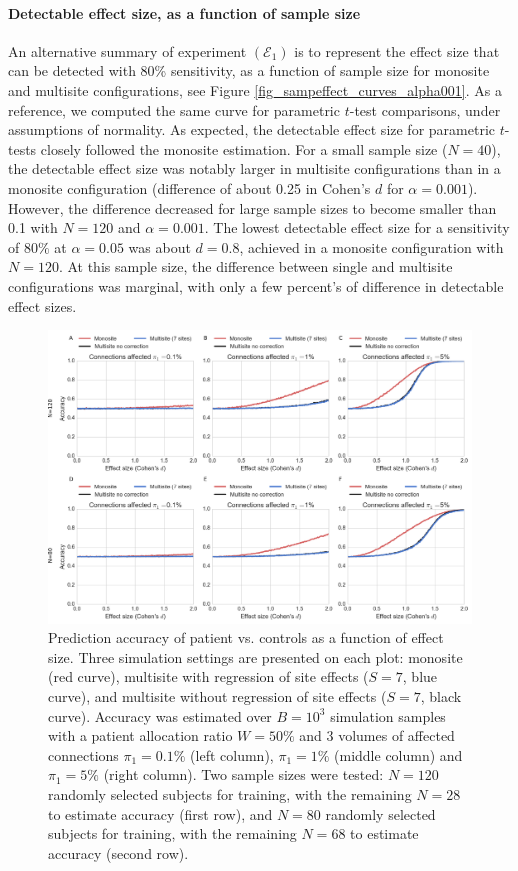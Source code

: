 \documentclass[authoryear]{elsarticle}
\begin{document}
\paragraph{Detectable effect size, as a function of sample size} An alternative summary of experiment $(\mathcal{E}_1)$ is to represent the effect size that can be detected with 80\% sensitivity, as a function of sample size for monosite and multisite configurations, see Figure \ref{fig_sampeffect_curves_alpha001}. As a reference, we computed the same curve for parametric $t$-test comparisons, under assumptions of normality. As expected, the detectable effect size for parametric $t$-tests closely followed the monosite estimation. For a small sample size ($N=40$), the detectable effect size was notably larger in multisite configurations than in a monosite configuration (difference of about 0.25 in Cohen's $d$ for $\alpha=0.001$). However, the difference decreased for large sample sizes to become smaller than 0.1 with $N=120$ and $\alpha=0.001$. The lowest detectable effect size for a sensitivity of $80\%$ at $\alpha=0.05$ was about $d=0.8$, achieved in a monosite configuration with $N=120$. At this sample size, the difference between single and multisite configurations was marginal, with only a few percent's of difference in detectable effect sizes.  



\begin{figure}[htbp]
\centering
\captionsetup[subfloat]{labelformat=empty}
\includegraphics[width=\textwidth]{../figures/prediction_effectsize.png}
\caption[]{
Prediction accuracy of patient vs. controls as a function of effect size. Three simulation settings are presented on each plot: monosite (red curve), multisite with regression of site effects ($S=7$, blue curve), and multisite without regression of site effects ($S=7$, black curve). Accuracy was estimated over $B=10^3$ simulation samples with a patient allocation ratio $W=50\%$ and 3 volumes of affected connections $\pi_1=0.1\%$ (left column), $\pi_1=1\%$ (middle column) and $\pi_1=5\%$ (right column). Two sample sizes were tested: $N=120$ randomly selected subjects for training, with the remaining $N=28$ to estimate accuracy (first row), and $N=80$ randomly selected subjects for training, with the remaining $N=68$ to estimate accuracy (second row).
}
\label{fig_prediction_sampeffect}
\end{figure}
\end{document}
